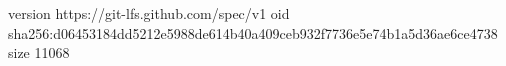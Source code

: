 version https://git-lfs.github.com/spec/v1
oid sha256:d06453184dd5212e5988de614b40a409ceb932f7736e5e74b1a5d36ae6ce4738
size 11068

